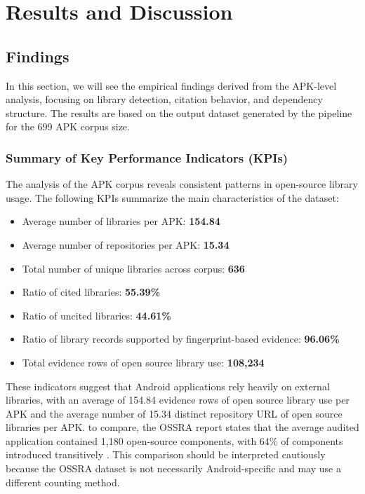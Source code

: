\documentclass[12pt,a4paper]{report}
\begin{document}
\chapter{Results and Discussion} \label{results-and-discussion}
\section{Findings}
In this section, we will see the empirical findings derived from the APK-level analysis, focusing on library detection, citation behavior, and dependency structure. The results are based on the output dataset generated by the pipeline for the 699 APK corpus size.

\subsection{Summary of Key Performance Indicators (KPIs)}
The analysis of the APK corpus reveals consistent patterns in open-source library usage. The following KPIs summarize the main characteristics of the dataset:

\begin{itemize}
\item Average number of libraries per APK: \textbf{154.84}
\item Average number of repositories per APK: \textbf{15.34}
\item Total number of unique libraries across corpus: \textbf{636}
\item Ratio of cited libraries: \textbf{55.39\%}
\item Ratio of uncited libraries: \textbf{44.61\%}
\item Ratio of library records supported by fingerprint-based evidence: \textbf{96.06\%}
\item Total evidence rows of open source library use: \textbf{108,234}
\end{itemize}

These indicators suggest that Android applications rely heavily on external libraries, with an average of 154.84 evidence rows of open source library use per APK and the average number of 15.34 distinct repository URL of open source libraries per APK. to compare, the OSSRA report states that the average audited application contained 1,180 open-source components, with 64\% of components introduced transitively \parencite{OpenSourceSecurity2026}. This comparison should be interpreted cautiously because the OSSRA dataset is not necessarily Android-specific and may use a different counting method.
\end{document}
